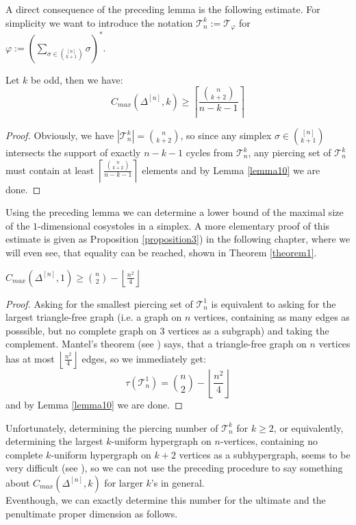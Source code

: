 A direct consequence of the preceding lemma is the following estimate. For simplicity we want to introduce the notation \(\mathcal{T}_n^k:=\mathcal{T}_{\varphi}\) for \(\varphi:=\left(\sum\limits_{\sigma\in\binom{[n]}{k+1}}\sigma\right)^*\).

\begin{prop}\label{proposition11}
Let \(k\) be odd, then we have:
\[
C_{max}(\Delta^{[n]},k)\geq \left\lceil\frac{\binom{n}{k+2}}{n-k-1}\right\rceil
\]
\begin{proof}
Obviously, we have \(|\mathcal{T}_n^k|=\binom{n}{k+2}\), so since any simplex \(\sigma\in\binom{[n]}{k+1}\) intersects the support of exactly \(n-k-1\) cycles from \(\mathcal{T}_n^k\), any piercing set of \(\mathcal{T}_n^k\) must contain at least \(\left\lceil\frac{\binom{n}{k+2}}{n-k-1}\right\rceil\) elements and by Lemma \ref{lemma10} we are done.
\end{proof}
\end{prop}

Using the preceding lemma we can determine a lower bound of the maximal size of the \(1\)-dimensional cosystoles in a simplex. A more elementary proof of this estimate is given as Proposition \ref{proposition3}) in the following chapter, where we will even see, that equality can be reached, shown in Theorem \ref{theorem1}.

\begin{prop}\label{proposition112}
\(C_{max}(\Delta^{[n]},1)\geq\binom{n}{2}-\left\lfloor\frac{n^2}{4}\right\rfloor\)
\begin{proof}
Asking for the smallest piercing set of \(\mathcal{T}_n^1\) is equivalent to asking for the largest triangle-free graph (i.e. a graph on \(n\) vertices, containing as many edges as posssible, but no complete graph on \(3\) vertices as a subgraph) and taking the complement. Mantel's theorem (see \cite{7}) says, that a triangle-free graph on \(n\) vertices has at most \(\left\lfloor\frac{n^2}{4}\right\rfloor\) edges, so we immediately get:
\[
\tau(\mathcal{T}_n^1)=\binom{n}{2}-\left\lfloor\frac{n^2}{4}\right\rfloor
\]
and by Lemma \ref{lemma10} we are done.
\end{proof}
\end{prop}

Unfortunately, determining the piercing number of \(\mathcal{T}_n^k\) for \(k\geq 2\), or equivalently, determining the largest \(k\)-uniform hypergraph on \(n\)-vertices, containing no complete \(k\)-uniform hypergraph on \(k+2\) vertices as a subhypergraph, seems to be very difficult (see \cite{7}), so we can not use the preceding procedure to say something about \(C_{max}(\Delta^{[n]},k)\) for larger \(k\)'s in general.\\
Eventhough, we can exactly determine this number for the ultimate and the penultimate proper dimension as follows.

